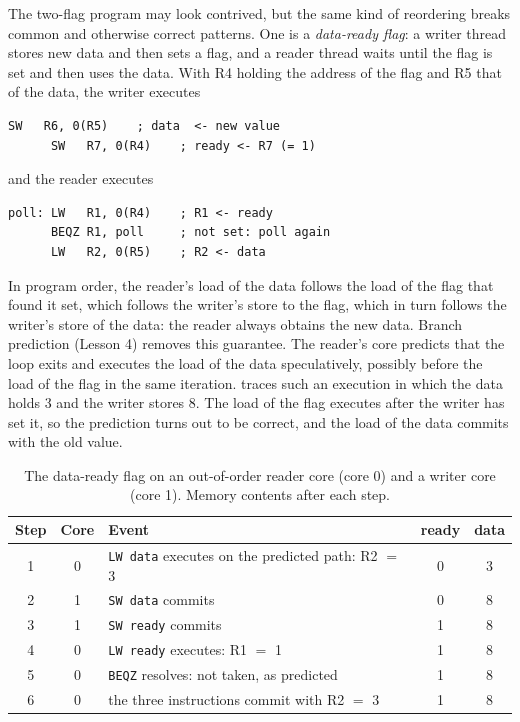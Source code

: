 \documentclass[../main.tex]{subfiles}
\begin{document}
The two-flag program may look contrived, but the same kind of reordering
breaks common and otherwise correct patterns.  One is a \emph{data-ready
flag}: a writer thread stores new data and then sets a flag, and a reader
thread waits until the flag is set and then uses the data.  With R4 holding
the address of the flag and R5 that of the data, the writer executes
\begin{lstlisting}[language={[x86masm]Assembler}, numbers=none]
      SW   R6, 0(R5)    ; data  <- new value
      SW   R7, 0(R4)    ; ready <- R7 (= 1)
\end{lstlisting}
and the reader executes
\begin{lstlisting}[language={[x86masm]Assembler}, numbers=none]
poll: LW   R1, 0(R4)    ; R1 <- ready
      BEQZ R1, poll     ; not set: poll again
      LW   R2, 0(R5)    ; R2 <- data
\end{lstlisting}
In program order, the reader's load of the data follows the load of the flag
that found it set, which follows the writer's store to the flag, which in turn
follows the writer's store of the data: the reader always obtains the new
data.  Branch prediction (Lesson 4) removes this guarantee.  The reader's core
predicts that the loop exits and executes the load of the data speculatively,
possibly before the load of the flag in the same iteration.
 traces such an execution in which the data
holds 3 and the writer stores 8.  The load of the flag executes after the
writer has set it, so the prediction turns out to be correct, and the load of
the data commits with the old value.

\begin{table}[htbp]
  \centering\small
  \caption{The data-ready flag on an out-of-order reader core (core 0) and a
    writer core (core 1).  Memory contents after each step.}
  \label{tab:l21-ready}
  \begin{tabular}{@{}cclcc@{}}
    \toprule
    Step & Core & Event & ready & data \\
    \midrule
    1 & 0 & \texttt{LW data} executes on the predicted path: R2 $=$ 3 & 0 & 3 \\
    2 & 1 & \texttt{SW data} commits                               & 0 & 8 \\
    3 & 1 & \texttt{SW ready} commits                              & 1 & 8 \\
    4 & 0 & \texttt{LW ready} executes: R1 $=$ 1                   & 1 & 8 \\
    5 & 0 & \texttt{BEQZ} resolves: not taken, as predicted        & 1 & 8 \\
    6 & 0 & the three instructions commit with R2 $=$ 3            & 1 & 8 \\
    \bottomrule
  \end{tabular}
\end{table}
\end{document}
